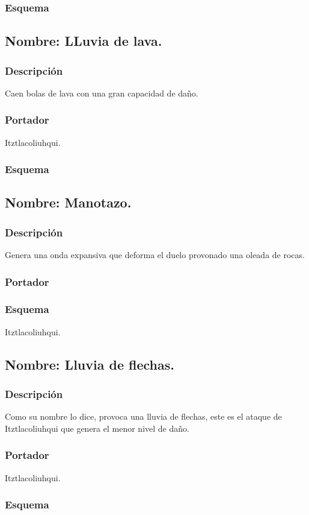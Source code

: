 \documentclass[11pt,letterpaper]{article}
\begin{document}
\subsubsection{Esquema}
\subsection{Nombre: LLuvia de lava.}
\subsubsection{Descripción}
Caen bolas de lava con una gran capacidad de daño.
\subsubsection{Portador}
Itztlacoliuhqui.	
\subsubsection{Esquema}	
\subsection{Nombre: Manotazo.}
\subsubsection{Descripción}
Genera una onda expansiva que deforma el duelo provonado una oleada de rocas.
\subsubsection{Portador}
\subsubsection{Esquema}
Itztlacoliuhqui.
\subsection{Nombre: Lluvia de flechas.}
\subsubsection{Descripción}
Como su nombre lo dice, provoca una lluvia de flechas, este es el ataque de Itztlacoliuhqui que genera el menor nivel de daño. 
\subsubsection{Portador}
Itztlacoliuhqui.
\subsubsection{Esquema}
\end{document}
